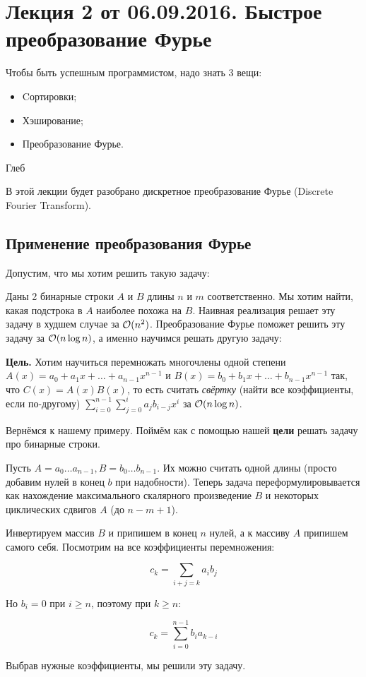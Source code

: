 \documentclass[a4paper, 12pt]{article}
\begin{document}
\pagestyle{fancy}

\section{Лекция 2 от 06.09.2016. Быстрое преобразование Фурье}
\epigraph{Чтобы быть успешным программистом, надо знать 3 вещи: 
\begin{itemize}
\item Cортировки;
\item Хэширование;
\item Преобразование Фурье.
\end{itemize}
\leavevmode}{Глеб}

В этой лекции будет разобрано дискретное преобразование Фурье (Discrete Fourier
Transform).

\subsection{Применение преобразования Фурье}

Допустим, что мы хотим решить такую задачу:

\begin{Examples}
  Даны 2 бинарные строки $A$ и $B$ длины $n$ и $m$ соответственно. Мы хотим найти, какая подстрока в $A$ наиболее
  похожа на $B$. Наивная реализация решает эту задачу в худшем случае за
  $\mathcal{O}(n^2)$. Преобразование
  Фурье поможет решить эту задачу за $\mathcal{O}(n\log n)$, а именно научимся решать другую
  задачу:

{\bf Цель.}
  Хотим научиться перемножать многочлены одной степени \newline $A(x) = a_0 + a_1x + \ldots + a_{n - 1}x^{n - 1}$
  и $B(x) = b_0 + b_1x + \ldots + b_{n - 1}x^{n - 1}$ так, что 
  $C(x) = A(x)B(x)$, то есть считать \textit{свёртку} (найти все коэффициенты, если по-другому) 
  $\sum\limits_{i = 0}^{n - 1} \sum\limits_{j = 0}^i a_jb_{i - j}x^i$ за $\mathcal{O}(n\log n)$.

Вернёмся к нашему примеру. Поймём как с помощью нашей {\bf цели} решать задачу
про бинарные строки.

Пусть $A = a_0 \ldots a_{n - 1}, B = b_0\ldots b_{n - 1}$. Их можно считать одной длины
(просто добавим нулей в конец $b$ при надобности). Теперь задача 
переформулировывается как нахождение максимального скалярного произведение
$B$ и некоторых циклических сдвигов $A$ (до $n - m + 1$).

Инвертируем массив $B$ и припишем в конец $n$ нулей, а к массиву
$A$ припишем самого себя. Посмотрим на все коэффициенты перемножения:

\[
  c_k = \sum\limits_{i + j = k} a_ib_j
\]

Но $b_i = 0$ при $i \geqslant n$, поэтому при $k \geqslant n$:

\[
  c_k = \sum\limits_{i = 0}^{n - 1} b_ia_{k - i}
\]

Выбрав нужные коэффициенты, мы решили эту задачу.

\end{Examples}
\end{document}
